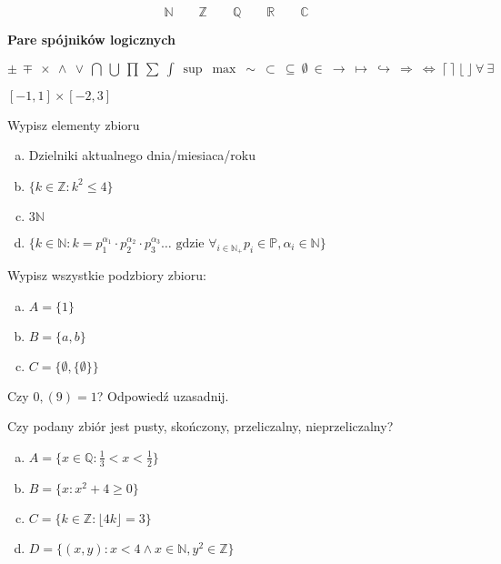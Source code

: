 \documentclass[12pt,a4paper]{article}
\theoremstyle{break}
\begin{document}
	$$\mathbb{N} \qquad \mathbb{Z} \qquad \mathbb{Q} \qquad \mathbb{R} \qquad \mathbb{C}$$
	
	\textbf{Pare spójników logicznych}
	
	$\pm\: \mp\: \times\: \wedge\: \vee\: \bigcap\: \bigcup\: \prod\: \sum\: \int\: \sup\: \max\: \sim\: \subset\: \subseteq\: \emptyset \: \in \: \longrightarrow\: \longmapsto\: \hookrightarrow\: \Rightarrow\: \Leftrightarrow\: \lceil\:\rceil\: \lfloor\:\rfloor\: \forall\: \exists $
	
	$[-1,1]\times [-2,3]$
	
	\begin{zad}
		Wypisz elementy zbioru
		\begin{enumerate}[a)]
			\item Dzielniki aktualnego dnia/miesiaca/roku
			\item $\{k\in\mathbb{Z}: k^2 \leq4\}$
			\item $3\mathbb{N}$
			\item $\{k \in \mathbb{N} : k=p_1^{\alpha_1}\cdot p_2^{\alpha_2}\cdot p_3^{\alpha_3}\dots \text{ gdzie } \forall_{i\in \mathbb{N}_+} p_i\in\mathbb{P}, \alpha_i \in\mathbb{N}\}$
		\end{enumerate}
	\end{zad}

	\begin{zad}
		Wypisz wszystkie podzbiory zbioru:
		\begin{enumerate}[a)]
			\item $A=\{1\}$
			\item $B=\{a,b\}$
			\item $C=\{\emptyset,\{\emptyset\}\}$
		\end{enumerate}
	\end{zad}

	\begin{zad}
		Czy $0,(9)=1$? Odpowiedź uzasadnij.
	\end{zad}

	\begin{zad}
		Czy podany zbiór jest pusty, skończony, przeliczalny, nieprzeliczalny?
		\begin{enumerate}[a)]
			\item $A=\{x\in\mathbb{Q} : \frac{1}{3}<x<\frac{1}{2}\}$
			\item $B=\{x: x^2+4\geq0\}$
			\item $C=\{k\in \mathbb{Z}: \lfloor 4k\rfloor=3 \} $
			\item $D=\{(x,y) : x<4 \wedge x\in \mathbb{N}, y^2\in\mathbb{Z} \}$
		\end{enumerate}
	\end{zad}
	
\end{document}
